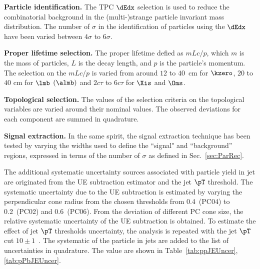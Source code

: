 \documentclass[ALICE,manyauthors]{cernphprep}
\begin{document}
\textbf{Particle identification.} The TPC $\dEdx$ selection is used to reduce the combinatorial background in the (multi-)strange particle invariant mass distribution.
The number of $\sigma$ in the identification of particles using the $\dEdx$ have been varied between $4\sigma$ to $6\sigma$.

\textbf{Proper lifetime selection.} The proper lifetime defied as $mLc/p$, which $m$ is the mass of particles, $L$ is the decay length, and $p$ is the particle's momentum.
The selection on the $mLc/p$ is varied from around $12$ to $40$~cm for $\kzero$, $20$ to $40$ cm for $\lmb$ $(\almb)$ and $2c\tau$ to $6c\tau$ for $\Xis$ and $\Oms$.

\textbf{Topological selection.} The values of the selection criteria on the topological variables are varied around their nominal values.
The observed deviations for each component are summed in quadrature.

\textbf{Signal extraction.} In the same spirit, the signal extraction technique has been tested by varying the widths used to define the ``signal" and ``background'' regions, expressed in terms of the number of $\sigma$ as defined in Sec.~\ref{sec:ParRec}.

The additional systematic uncertainty sources associated with particle yield in jet are originated from the UE subtraction estimator and the jet $\pT$ threshold.
The systematic uncertainty due to the UE subtraction is estimated by varying the perpendicular cone radius from the chosen thresholds from 0.4~(PC04) to 0.2~(PC02) and 0.6~(PC06).
From the deviation of different PC cone size, the relative systematic uncertainty of the UE subtraction is obtained.
To estimate the effect of jet $\pT$ thresholds uncertainty, the analysis is repeated with the jet $\pT$ cut $10\pm 1$~\GeVc.
The systematic of the particle in jets are added to the list of uncertainties in quadrature.
The value are shown in Table~\ref{tab:ppJEUncer}, \ref{tab:pPbJEUncer}.
\end{document}
